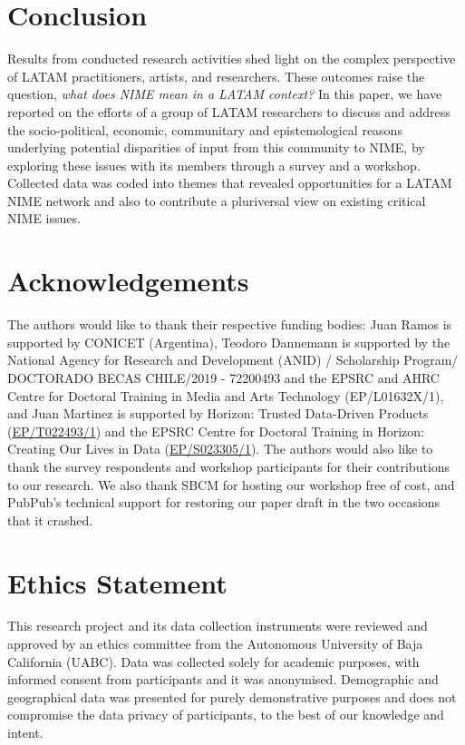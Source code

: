\documentclass[sigconf]{nimeart}
\begin{document}
\section{Conclusion}\label{conclusion}

Results from conducted research activities shed light on the complex perspective of LATAM practitioners, artists, and researchers. These outcomes raise the question, \emph{what does NIME mean in a LATAM context?} In this paper, we have reported on the efforts of a group of LATAM researchers to discuss and address the socio-political, economic, communitary and epistemological reasons underlying potential disparities of input from this community to NIME, by exploring these issues with its members through a survey and a workshop. Collected data was coded into themes that revealed opportunities for a LATAM NIME network and also to contribute a pluriversal view on existing critical NIME issues.

\section{Acknowledgements}\label{acknowledgements}

The authors would like to thank their respective funding bodies: Juan Ramos is supported by CONICET (Argentina), Teodoro Dannemann is supported by the National Agency for Research and Development (ANID) / Scholarship Program/ DOCTORADO BECAS CHILE/2019 - 72200493 and the EPSRC and AHRC Centre for Doctoral Training in Media and Arts Technology (EP/L01632X/1), and Juan Martinez is supported by Horizon: Trusted Data-Driven Products (\href{https://gow.epsrc.ukri.org/NGBOViewGrant.aspx?GrantRef=EP/T022493/1}{EP/T022493/1}) and the EPSRC Centre for Doctoral Training in Horizon: Creating Our Lives in Data (\href{https://gow.epsrc.ukri.org/NGBOViewGrant.aspx?GrantRef=EP/S023305/1}{EP/S023305/1}). The authors would also like to thank the survey respondents and workshop participants for their contributions to our research. We also thank SBCM for hosting our workshop free of cost, and PubPub's technical support for restoring our paper draft in the two occasions that it crashed.

\section{Ethics Statement}\label{ethics-statement}

This research project and its data collection instruments were reviewed and approved by an ethics committee from the Autonomous University of Baja California (UABC). Data was collected solely for academic purposes, with informed consent from participants and it was anonymised. Demographic and geographical data was presented for purely demonstrative purposes and does not compromise the data privacy of participants, to the best of our knowledge and intent.



\end{document}
